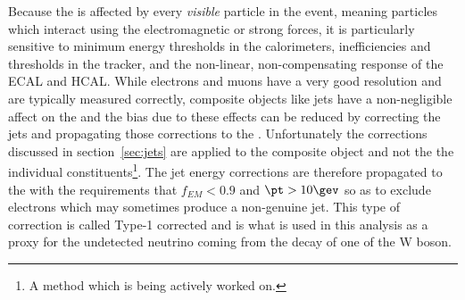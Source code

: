 Because the \VETslash is affected by every \textit{visible} particle in the event, meaning particles which interact using the electromagnetic or strong forces, it is particularly sensitive to minimum energy thresholds in the calorimeters, inefficiencies and \pt thresholds in the tracker, and the non-linear, non-compensating response of the ECAL and HCAL.
While electrons and muons have a very good resolution and are typically measured correctly, composite objects like jets have a non-negligible affect on the \VETslash and the bias due to these effects can be reduced by correcting the jets and propagating those corrections to the \VETslash.
Unfortunately the corrections discussed in section~\ref{sec:jets} are applied to the composite object and not the the individual constituents\footnote{A method which is being actively worked on.}.
The jet energy corrections are therefore propagated to the \VETslash with the requirements that $f_{EM}<0.9$ and $\pt>10\gev$ so as to exclude electrons which may sometimes produce a non-genuine jet.
This type of correction is called Type-1 corrected \VETslash and is what is used in this analysis as a proxy for the undetected neutrino coming from the decay of one of the W boson.
